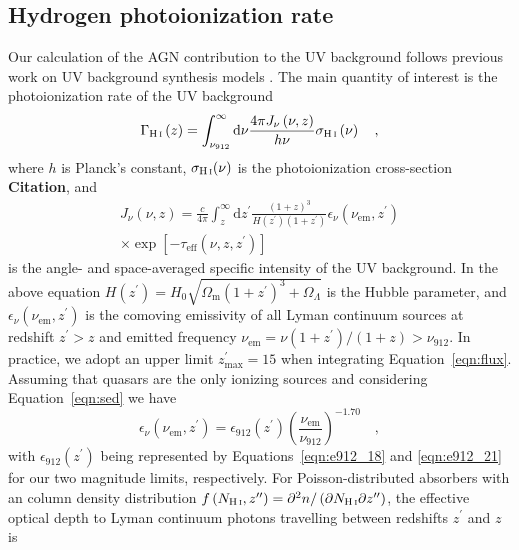 \documentclass[fleqn,usenatbib]{mnras}
\begin{document}
\subsection{Hydrogen photoionization rate}
\label{sec:gammahi}


Our calculation of the AGN contribution to the UV background follows previous work on
UV background synthesis models \citep[e.g.][]{1996ApJ...461...20H,2012ApJ...746..125H}.
The main quantity of interest is the  photoionization rate of the UV background
\begin{equation}
  \Gamma_\ion{H}{i}\left(z\right)=\int_{\nu_{912}}^\infty\mathrm{d}\nu
  \frac{4\pi J_\nu\left(\nu,z\right)}{h\nu} \sigma_\ion{H}{i}\left(\nu\right)\quad,
\end{equation}
where $h$ is Planck's constant, $\sigma_\ion{H}{i}(\nu)$ is the  photoionization cross-section \textbf{Citation}, and
\begin{multline}
  J_\nu(\nu, z)=\frac{c}{4\pi}\int_{z}^\infty\mathrm{d}z^\prime\frac{\left(1+z\right)^3}{H\left(z^\prime\right)\left(1+z^\prime\right)}\epsilon_\nu\left(\nu_\mathrm{em},z^\prime\right)\\
  \times\exp{\left[-\tau_\mathrm{eff}\left(\nu, z, z^\prime\right)\right]}
  \label{eqn:flux}
\end{multline}
is the angle- and space-averaged specific intensity of the UV background. In the above equation
$H\left(z^\prime\right)=H_0\sqrt{\Omega_\mathrm{m}\left(1+z^\prime\right)^3+\Omega_\Lambda}$
is the Hubble parameter, and $\epsilon_\nu\left(\nu_\mathrm{em},z^\prime\right)$
is the comoving emissivity of all  Lyman continuum sources at redshift $z^\prime>z$ and emitted frequency
$\nu_\mathrm{em}=\nu\left(1+z^\prime\right)/\left(1+z\right)>\nu_{912}$.
In practice, we adopt an upper limit $z^\prime_\mathrm{max}=15$ when integrating Equation~\eqref{eqn:flux}.
Assuming that quasars are the only ionizing sources and considering Equation~\eqref{eqn:sed} we have 
\begin{equation}
  \epsilon_\nu\left(\nu_\mathrm{em},z^\prime\right) = \epsilon_{912}\left(z^\prime\right)\left(\frac{\nu_\mathrm{em}}{\nu_{912}}\right)^{-1.70}\quad,
  \label{eqn:epsilon_freq}
\end{equation}
with $\epsilon_{912}\left(z^\prime\right)$ being represented by Equations~\eqref{eqn:e912_18} and \eqref{eqn:e912_21} for our two magnitude limits, respectively.
For Poisson-distributed absorbers with an  column density distribution $f\left(N_\ion{H}{i},z^{\prime\prime}\right)=\partial^2n/\left(\partial N_\ion{H}{i}\partial z^{\prime\prime}\right)$, the effective optical depth to  Lyman continuum photons travelling between redshifts $z^\prime$ and $z$ is \citep{1980ApJ...240..387P} 
\end{document}
